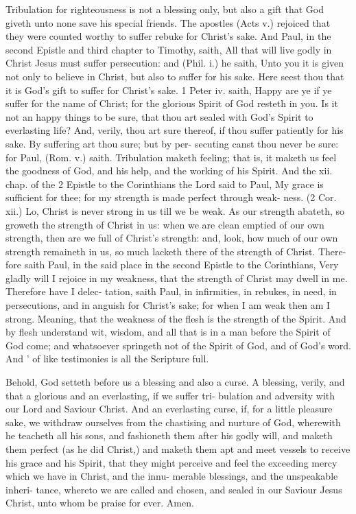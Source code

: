 \documentclass{custom}
\begin{document}
Tribulation for righteousness is not a blessing 
only, but also a gift that God giveth unto none 
save his special friends. The apostles (Acts v.) 
rejoiced that they were counted worthy to suffer 
rebuke for Christ's sake. And Paul, in the second 
Epistle and third chapter to Timothy, saith, All 
that will live godly in Christ Jesus must suffer 
persecution: and (Phil. i.) he saith, Unto you it is 
given not only to believe in Christ, but also to suffer 
for his sake. Here seest thou that it is God's gift 
to suffer for Christ's sake. 1 Peter iv. saith, Happy 
are ye if ye suffer for the name of Christ; for the 
glorious Spirit of God resteth in you. Is it not an 
happy things to be sure, that thou art sealed with 
God's Spirit to everlasting life? And, verily, thou 
art sure thereof, if thou suffer patiently for his 
sake. By suffering art thou sure; but by per- 
secuting canst thou never be sure: for Paul, 
(Rom. v.) saith. Tribulation maketh feeling; that 
is, it maketh us feel the goodness of God, and 
his help, and the working of his Spirit. And the
xii. chap. of the 2 Epistle to the Corinthians the
Lord said to Paul, My grace is sufficient for thee;
for my strength is made perfect through weak- 
ness. (2 Cor. xii.) Lo, Christ is never strong in 
us till we be weak. As our strength abateth, so 
groweth the strength of Christ in us: when we 
are clean emptied of our own strength, then are
we full of Christ's strength: and, look, how much
of our own strength remaineth in us, so much 
lacketh there of the strength of Christ. There- 
fore saith Paul, in the said place in the second 
Epistle to the Corinthians, Very gladly will I 
rejoice in my weakness, that the strength of 
Christ may dwell in me. Therefore have I delec- 
tation, saith Paul, in infirmities, in rebukes, in 
need, in persecutions, and in anguish for Christ's 
sake; for when I am weak then am I strong. 
Meaning, that the weakness of the flesh is the 
strength of the Spirit. And by flesh understand
wit, wisdom, and all that is in a man before the 
Spirit of God come; and whatsoever springeth 
not of the Spirit of God, and of God's word. And ' 
of like testimonies is all the Scripture full.

Behold, God setteth before us a blessing and 
also a curse. A blessing, verily, and that a 
glorious and an everlasting, if we suffer tri- 
bulation and adversity with our Lord and Saviour 
Christ. And an everlasting curse, if, for a little 
pleasure sake, we withdraw ourselves from the 
chastising and nurture of God, wherewith he 
teacheth all his sons, and fashioneth them after 
his godly will, and maketh them perfect (as he 
did Christ,) and maketh them apt and meet 
vessels to receive his grace and his Spirit, that 
they might perceive and feel the exceeding 
mercy which we have in Christ, and the innu- 
merable blessings, and the unspeakable inheri- 
tance, whereto we are called and chosen, and 
sealed in our Saviour Jesus Christ, unto whom 
be praise for ever. Amen. 
\end{document}
